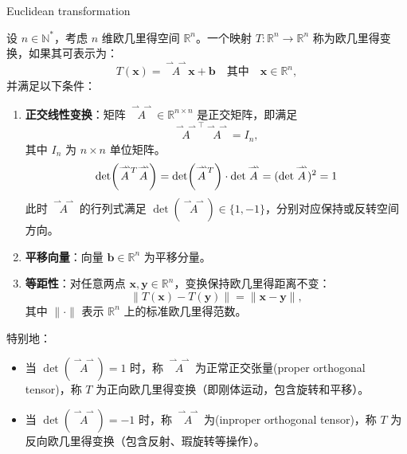 \documentclass[12pt, a4paper, oneside, UTF8]{ctexbook}  %
\newcommand{\vvec}{\overset{\rightharpoonup\!\!\!\! \rightharpoonup}}
\newcommand{\lsup}[1]{\raisebox{-0.85ex}{$\scriptstyle #1$}}
\begin{document}
\begin{defn}
    Euclidean transformation
    
    设 \( n \in \mathbb{N}^* \)，考虑 \( n \) 维欧几里得空间 \( \mathbb{R}^n \)。一个映射 \( T: \mathbb{R}^n \to \mathbb{R}^n \) 称为欧几里得变换，如果其可表示为：
    \begin{equation*}
        T(\mathbf{x}) = \vvec{A}\mathbf{x} + \mathbf{b} \quad \text{其中} \quad \mathbf{x} \in \mathbb{R}^n,
    \end{equation*}
    并满足以下条件：
    \begin{enumerate}
        \item \textbf{正交线性变换}：矩阵 \( \vvec{A} \in \mathbb{R}^{n \times n} \) 是正交矩阵，即满足
        \[
            \vvec{A}^\top \vvec{A} = I_n,
        \]
        其中 \( I_n \) 为 \( n \times n \) 单位矩阵。
        \[\det(\vvec{A}^{\lsup{T}}\vvec{A})=\det(\vvec{A}^{\lsup{T}})\cdot\det \vvec{A}=(\det \vvec{A})^2=1\]
        此时 \( \vvec{A} \) 的行列式满足 \( \det(\vvec{A}) \in \{1, -1\} \)，分别对应保持或反转空间方向。
    
        \item \textbf{平移向量}：向量 \( \mathbf{b} \in \mathbb{R}^n \) 为平移分量。
    
        \item \textbf{等距性}：对任意两点 \( \mathbf{x}, \mathbf{y} \in \mathbb{R}^n \)，变换保持欧几里得距离不变：
        \[
            \| T(\mathbf{x}) - T(\mathbf{y}) \| = \| \mathbf{x} - \mathbf{y} \|,
        \]
        其中 \( \| \cdot \| \) 表示 \( \mathbb{R}^n \) 上的标准欧几里得范数。
    \end{enumerate}
    
    特别地：
    \begin{itemize}
        \item 当 \( \det(\vvec{A}) = 1 \) 时，称 \( \vvec{A} \) 为正常正交张量(proper orthogonal tensor)，称 \( T \) 为正向欧几里得变换（即刚体运动，包含旋转和平移）。
        \item 当 \( \det(\vvec{A}) = -1 \) 时，称 \( \vvec{A} \) 为(inproper orthogonal tensor)，称 \( T \) 为反向欧几里得变换（包含反射、瑕旋转等操作）。
    \end{itemize}
    \end{defn}
\end{document}
